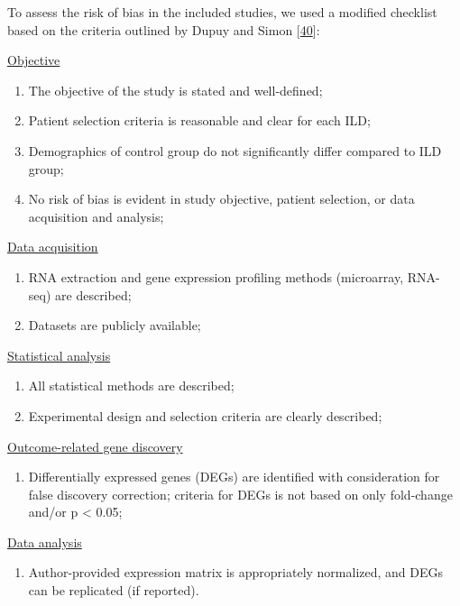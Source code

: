 \documentclass[
]{article}
\providecommand{\tightlist}{%
  \setlength{\itemsep}{0pt}\setlength{\parskip}{0pt}}
\begin{document}
To assess the risk of bias in the included studies, we used a modified checklist based on the criteria outlined by Dupuy and Simon {[}\protect\hyperlink{ref-dupuy_critical_2007}{40}{]}:

\underline{Objective}

\begin{enumerate}
\def\labelenumi{\arabic{enumi}.}
\tightlist
\item
  The objective of the study is stated and well-defined;
\item
  Patient selection criteria is reasonable and clear for each ILD;
\item
  Demographics of control group do not significantly differ compared to ILD group;
\item
  No risk of bias is evident in study objective, patient selection, or data acquisition and analysis;
\end{enumerate}

\underline{Data acquisition}

\begin{enumerate}
\def\labelenumi{\arabic{enumi}.}
\setcounter{enumi}{4}
\tightlist
\item
  RNA extraction and gene expression profiling methods (microarray, RNA-seq) are described;
\item
  Datasets are publicly available;
\end{enumerate}

\underline{Statistical analysis}

\begin{enumerate}
\def\labelenumi{\arabic{enumi}.}
\setcounter{enumi}{6}
\tightlist
\item
  All statistical methods are described;
\item
  Experimental design and selection criteria are clearly described;
\end{enumerate}

\underline{Outcome-related gene discovery}

\begin{enumerate}
\def\labelenumi{\arabic{enumi}.}
\setcounter{enumi}{8}
\tightlist
\item
  Differentially expressed genes (DEGs) are identified with consideration for false discovery correction; criteria for DEGs is not based on only fold-change and/or p \textless{} 0.05;
\end{enumerate}

\underline{Data analysis}

\begin{enumerate}
\def\labelenumi{\arabic{enumi}.}
\setcounter{enumi}{9}
\tightlist
\item
  Author-provided expression matrix is appropriately normalized, and DEGs can be replicated (if reported).
\end{enumerate}
\end{document}
